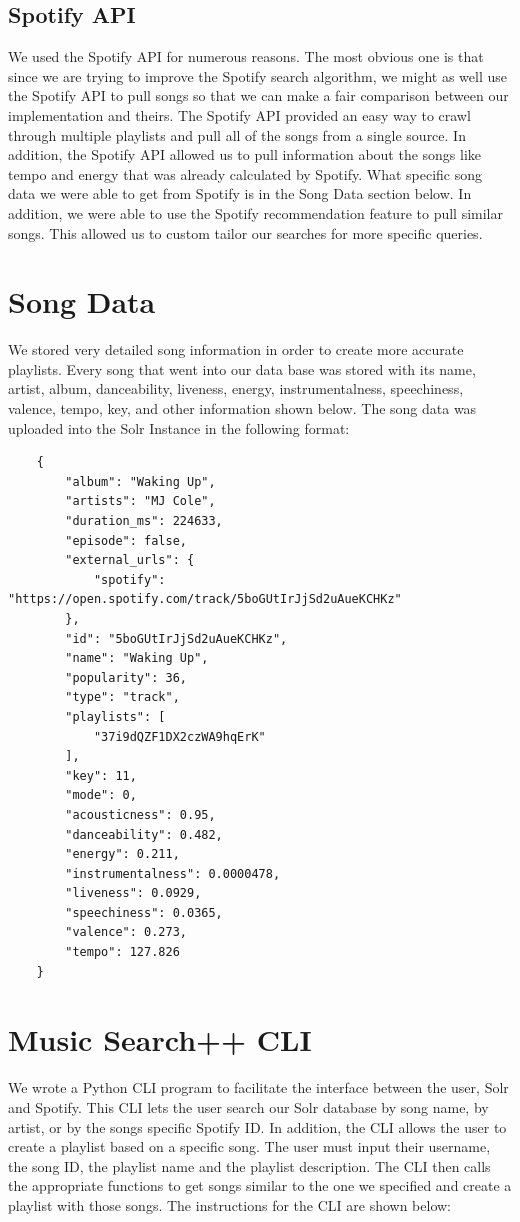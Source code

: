 \documentclass [letter,12pt] {article}
\begin{document}
    \subsection{Spotify API}
        We used the Spotify API for numerous reasons. The most obvious one is that since we are trying to improve the Spotify search algorithm, we might as well use the Spotify API to pull songs so that we can make a fair comparison between our implementation and theirs. The Spotify API provided an easy way to crawl through multiple playlists and pull all of the songs from a single source. In addition, the Spotify API allowed us to pull information about the songs like tempo and energy that was already calculated by Spotify. What specific song data we were able to get from Spotify is in the Song Data section below. In addition, we were able to use the Spotify recommendation feature to pull similar songs. This allowed us to custom tailor our searches for more specific queries. 
        


        
\section{Song Data}
    We stored very detailed song information in order to create more accurate playlists. Every song that went into our data base was stored with its name, artist, album, danceability, liveness, energy, instrumentalness, speechiness, valence, tempo, key, and other information shown below. The song data was uploaded into the Solr Instance in the following format:
    
    \begin{verbatim}
    {
        "album": "Waking Up",
        "artists": "MJ Cole",
        "duration_ms": 224633,
        "episode": false,
        "external_urls": {
            "spotify": "https://open.spotify.com/track/5boGUtIrJjSd2uAueKCHKz"
        },
        "id": "5boGUtIrJjSd2uAueKCHKz",
        "name": "Waking Up",
        "popularity": 36,
        "type": "track",
        "playlists": [
            "37i9dQZF1DX2czWA9hqErK"
        ],
        "key": 11,
        "mode": 0,
        "acousticness": 0.95,
        "danceability": 0.482,
        "energy": 0.211,
        "instrumentalness": 0.0000478,
        "liveness": 0.0929,
        "speechiness": 0.0365,
        "valence": 0.273,
        "tempo": 127.826
    }
    \end{verbatim}
    
\section{Music Search++ CLI}
    We wrote a Python CLI program to facilitate the interface between the user, Solr and Spotify. This CLI lets the user search our Solr database by song name, by artist, or by the songs specific Spotify ID. In addition, the CLI allows the user to create a playlist based on a specific song. The user must input their username, the song ID, the playlist name and the playlist description. The CLI then calls the appropriate functions to get songs similar to the one we specified and create a playlist with those songs. The instructions for the CLI are shown below:
    
\end{document}
